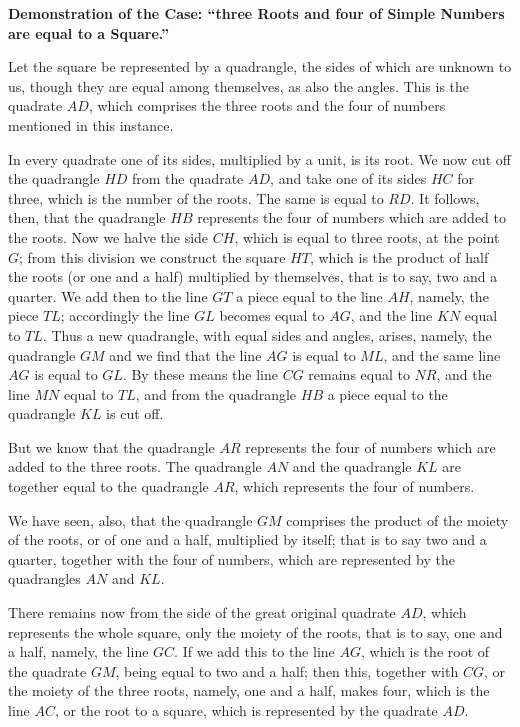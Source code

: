 \vspace{0.5cm}
\noindent\textbf{Demonstration of the Case: ``three Roots and four of Simple Numbers are equal to a Square.''}

Let the square be represented by a quadrangle, the sides of which are unknown to us, though they are equal among themselves, as also the angles. This is the quadrate $AD$, which comprises the three roots and the four of numbers mentioned in this instance.

In every quadrate one of its sides, multiplied by a unit, is its root. We now cut off the quadrangle $HD$ from the quadrate $AD$, and take one of its sides $HC$ for three, which is the number of the roots. The same is equal to $RD$. It follows, then, that the quadrangle $HB$ represents the four of numbers which are added to the roots. Now we halve the side $CH$, which is equal to three roots, at the point $G$; from this division we construct the square $HT$, which is the product of half the roots (or one and a half) multiplied by themselves, that is to say, two and a quarter. We add then to the line $GT$ a piece equal to the line $AH$, namely, the piece $TL$; accordingly the line $GL$ becomes equal to $AG$, and the line $KN$ equal to $TL$. Thus a new quadrangle, with equal sides and angles, arises, namely, the quadrangle $GM$ and we find that the line $AG$ is equal to $ML$, and the same line $AG$ is equal to $GL$. By these means the line $CG$ remains equal to $NR$, and the line $MN$ equal to $TL$, and from the quadrangle $HB$ a piece equal to the quadrangle $KL$ is cut off.

But we know that the quadrangle $AR$ represents the four of numbers which are added to the three roots. The quadrangle $AN$ and the quadrangle $KL$ are together equal to the quadrangle $AR$, which represents the four of numbers.

We have seen, also, that the quadrangle $GM$ comprises the product of the moiety of the roots, or of one and a half, multiplied by itself; that is to say two and a quarter, together with the four of numbers, which are represented by the quadrangles $AN$ and $KL$.

There remains now from the side of the great original quadrate $AD$, which represents the whole square, only the moiety of the roots, that is to say, one and a half, namely, the line $GC$. If we add this to the line $AG$, which is the root of the quadrate $GM$, being equal to two and a half; then this, together with $CG$, or the moiety of the three roots, namely, one and a half, makes four, which is the line $AC$, or the root to a square, which is represented by the quadrate $AD$.

